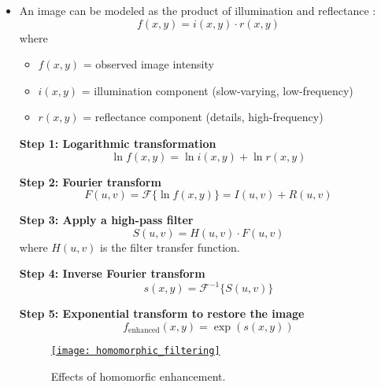 \begin{itemize}
\item An image can be modeled as the product of illumination and
  reflectance \cite{wikipedia_luminance}:
\[
f(x, y) = i(x, y) \cdot r(x, y)
\]
where
\begin{itemize}
    \item $f(x, y)$ = observed image intensity
    \item $i(x, y)$ = illumination component (slow-varying, low-frequency)
    \item $r(x, y)$ = reflectance component (details, high-frequency)
\end{itemize}

\textbf{Step 1: Logarithmic transformation}
\[
\ln f(x, y) = \ln i(x, y) + \ln r(x, y)
\]

\textbf{Step 2: Fourier transform}
\[
F(u, v) = \mathcal{F}\{\ln f(x, y)\} = I(u, v) + R(u, v)
\]

\textbf{Step 3: Apply a high-pass filter}
\[
S(u, v) = H(u, v) \cdot F(u, v)
\]
where $H(u,v)$ is the filter transfer function.

\textbf{Step 4: Inverse Fourier transform}
\[
s(x, y) = \mathcal{F}^{-1}\{S(u, v)\}
\]

\textbf{Step 5: Exponential transform to restore the image}
\[
f_{\text{enhanced}}(x, y) = \exp(s(x, y))
\]

\begin{figure}[H]
  \vspace{-0ex}
  \centering
  \href{https://github.com/vicente-gonzalez-ruiz/medical_imaging/blob/main/notebooks/homomorphic_filtering.ipynb}{\texttt{[image: homomorphic\_filtering]}}
  \caption{Effects of homomorfic enhancement.}
  \label{fig:homomorphic_filtering}
\end{figure}

\end{itemize}
